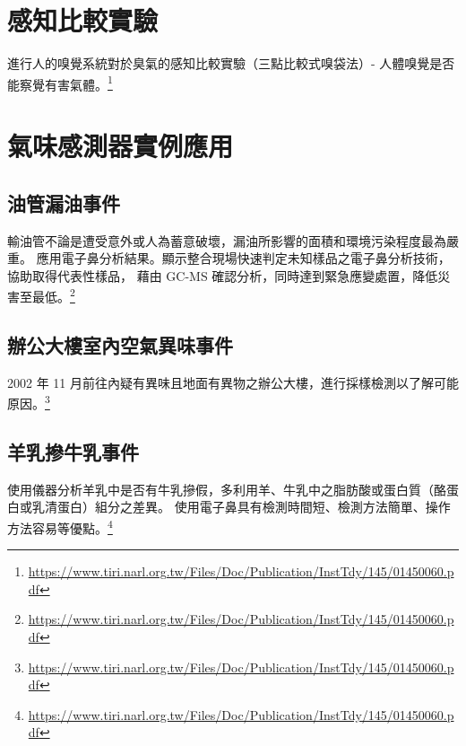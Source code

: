 \section{感知比較實驗}
進行人的嗅覺系統對於臭氣的感知比較實驗（三點比較式嗅袋法）- 人體嗅覺是否能察覺有害氣體。\footnote{\url{https://www.tiri.narl.org.tw/Files/Doc/Publication/InstTdy/145/01450060.pdf}}

\section{氣味感測器實例應用}
	\subsection{油管漏油事件}
	輸油管不論是遭受意外或人為蓄意破壞，漏油所影響的面積和環境污染程度最為嚴重。
	應用電子鼻分析結果。顯示整合現場快速判定未知樣品之電子鼻分析技術，協助取得代表性樣品，
	藉由 GC-MS 確認分析，同時達到緊急應變處置，降低災害至最低。\footnote{\url{https://www.tiri.narl.org.tw/Files/Doc/Publication/InstTdy/145/01450060.pdf}}
	\subsection{辦公大樓室內空氣異味事件}
	2002 年 11 月前往內疑有異味且地面有異物之辦公大樓，進行採樣檢測以了解可能原因。\footnote{\url{https://www.tiri.narl.org.tw/Files/Doc/Publication/InstTdy/145/01450060.pdf}}
	\subsection{羊乳摻牛乳事件}
	使用儀器分析羊乳中是否有牛乳摻假，多利用羊、牛乳中之脂肪酸或蛋白質（酪蛋白或乳清蛋白）組分之差異。
	使用電子鼻具有檢測時間短、檢測方法簡單、操作方法容易等優點。\footnote{\url{https://www.tiri.narl.org.tw/Files/Doc/Publication/InstTdy/145/01450060.pdf}}